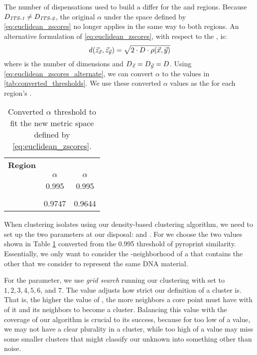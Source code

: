 The number of dispensations \numdims{} used to build a \pyro{} differ for the \Ssixt{} and \Sfive{} regions.
Because  $D{}_{\textit{\textit{ITS}{}-1}{}} \neq D{}_{\textit{\textit{ITS}{}-2}{}}$, the original $\alpha$ under the space defined by \eqref{eq:euclidean_zscores} no longer applies in the same way to both regions.
An alternative formulation of \eqref{eq:euclidean_zscores}, with respect to the \pearson{} \pcfunclabel{}, is:
\begin{equation}\label{eq:euclidean_zscores_alternate}
 \mathit{d}{}(\vec{z}_{\vec{x}}, \vec{z}_{\vec{y}}) = \sqrt{ 2\cdot D{}\cdot\rho{}(\vec{x}, \vec{y}) } 
\end{equation}
where \numdims{} is the number of dimensions and $D{}_{\vec{x}{}} = D{}_{\vec{y}{}} = D{}$. 
Using \autoref{eq:euclidean_zscores_alternate}, we can convert $\alpha$ to the values in \autoref{tab:converted_thresholds}. 
We use these converted $\alpha$ values as the \eps{} for each \itsshort{} region's .
\begin{table}
\centering
\caption{Converted $\alpha$ threshold to fit the new metric space defined by \eqref{eq:euclidean_zscores}.}
\label{tab:converted_thresholds}
\begin{tabular}{|c|c|c|}
\hline
\textbf{\itsshort{} Region} & \Ssixt{}     & \Sfive{}     \\
                            & $\alpha$     & $\alpha$     \\ \hline
\pcfunc{\pca}{\pcb}         & 0.995        & 0.995        \\ \hline
\numdims{}                  & \Ssixtdims{} & \Sfivedims{} \\ \hline
\euczfunc{\pca{}}{\pcb{}}   & 0.9747       & 0.9644       \\ \hline
\end{tabular}
\end{table}

When clustering \cplop{} isolates using our density-based clustering algorithm, we need to set up the two parameters at our disposal: \minneigh{} and \eps{}.
For \eps{} we choose the two values shown in Table \ref{tab:converted_thresholds} converted from the 0.995 \pearson{} threshold of pyroprint similarity. 
Essentially, we only want to consider the \eps{}-neighborhood of a \pyro{} that contains the other \pyros{} that we consider to represent the same DNA material.

For the \minneigh{} parameter, we use \textit{grid search} running our clustering with \minneigh{} set to $1, 2, 3, 4, 5, 6$, and $7$.
The \minneigh{} value adjusts how strict our definition of a cluster is.
That is, the higher the value of \minneigh{}, the more neighbors a core point must have with \eps{} of it and its neighbors to become a cluster.
Balancing this value with the coverage of our algorithm is crucial to its success, because for too low of a value, we may not have a clear plurality in a cluster, while too high of a value may miss some smaller clusters that might classify our unknown \isol{} into something other than noise.
